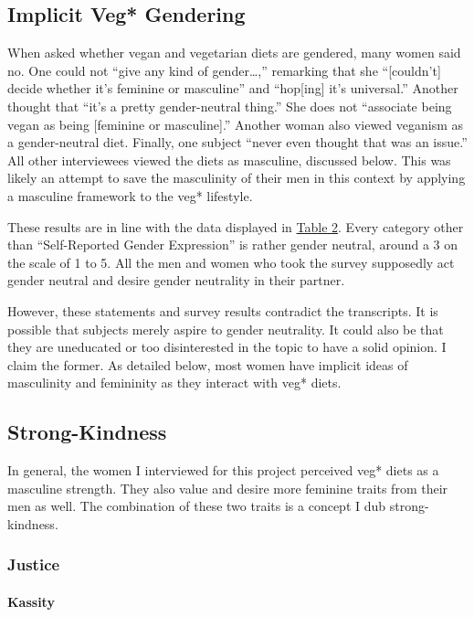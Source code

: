 \documentclass[twoside]{report}
\begin{document}
\begin{multicols}{2}
\subsection{Implicit Veg* Gendering}

When asked whether vegan and vegetarian diets are gendered, many women
said no. One could not ``give any kind of gender\ldots,'' remarking
that she ``{[}couldn't{]} decide whether it's feminine or masculine''
and ``hop{[}ing{]} it's universal.'' Another thought that ``it's a
pretty gender-neutral thing.'' She does not ``associate being vegan as
being {[}feminine or masculine{]}.'' Another woman also viewed veganism as
a gender-neutral diet. Finally, one subject ``never even thought that
was an issue.'' All other interviewees viewed the diets as masculine,
discussed below. This was likely an attempt to save the masculinity of
their men in this context by applying a masculine framework to the veg* lifestyle.

These results are in line with the data displayed in \hyperlink{table-2}{Table 2}. Every category other than ``Self-Reported Gender Expression'' is rather gender neutral, around a 3 on the scale of 1 to 5. All the men and women who
took the survey supposedly act gender neutral and desire gender
neutrality in their partner.

However, these statements and survey results contradict the transcripts. It is possible that subjects merely aspire to gender neutrality. It could also be that they are uneducated or too disinterested in the topic to have a solid opinion. I claim the former. As detailed below, most women have implicit ideas of masculinity and femininity as they interact with veg* diets.

\subsection{Strong-Kindness}

In general, the women I interviewed for this project perceived veg* diets as a
masculine strength. They also value and desire more feminine traits from
their men as well. The combination of these two traits is a concept I
dub strong-kindness.

\subsubsection{Justice}

\paragraph{Kassity}


\end{multicols}
\end{document}
